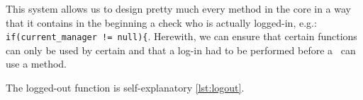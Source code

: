 This system allows us to design pretty much every method in the core in a way that it contains in the beginning a check who is actually logged-in, e.g.: \lstinline|if(current_manager != null){|. Herewith, we can ensure that certain functions can only be used by certain \User and that a log-in had to be performed before a \User~can use a method.

The logged-out function is self-explanatory \ref{lst:logout}.













